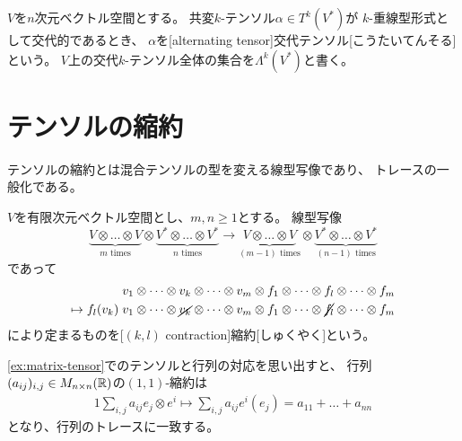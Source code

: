 \documentclass[report]{jlreq}
\begin{document}
\begin{definition}[交代テンソル]
    $V$を$n$次元ベクトル空間とする。
    共変$k$-テンソル$\alpha \in T^k(V^*)$が
    $k$-重線型形式として交代的であるとき、
    $\alpha$を[alternating tensor]{交代テンソル}[こうたいてんそる]という。
    $V$上の交代$k$-テンソル全体の集合を$\Lambda^k(V^*)$と書く。
\end{definition}

%
\section{テンソルの縮約}

テンソルの縮約とは混合テンソルの型を変える線型写像であり、
トレースの一般化である。

\begin{definition}[縮約]
    $V$を有限次元ベクトル空間とし、$m, n \ge 1$とする。
    線型写像
    \begin{equation}
        \underbrace{V \otimes \dots \otimes V}_{m \text{ times}}
        \otimes
        \underbrace{V^* \otimes \dots \otimes V^*}_{n \text{ times}}
        \to
        \underbrace{V \otimes \dots \otimes V}_{(m - 1) \text{ times}}
        \otimes
        \underbrace{V^* \otimes \dots \otimes V^*}_{(n - 1) \text{ times}}
    \end{equation}
    であって
    \begin{alignat}{1}
        &v_1 \otimes \dots \otimes v_k \otimes \dots \otimes v_m
            \otimes f_1 \otimes \dots \otimes f_l \otimes \dots \otimes f_m \\
        \mapsto f_l(v_k) \;
            &v_1 \otimes \dots \otimes \cancel{v_k} \otimes \dots \otimes v_m
            \otimes f_1 \otimes \dots \otimes \cancel{f_l} \otimes \dots \otimes f_m
    \end{alignat}
    により定まるものを[$(k, l)$ contraction]{縮約}[しゅくやく]という。
\end{definition}

\begin{example}[行列のトレースと縮約]
    \cref{ex:matrix-tensor}でのテンソルと行列の対応を思い出すと、
    行列$(a_{ij})_{i,j} \in M_{n \times n}(\mathbb{R})$の$(1, 1)$-縮約は
    \begin{alignat}{1}
        \sum_{i, j} a_{ij} e_j \otimes e^i
        \mapsto
        \sum_{i, j} a_{ij} e^i(e_j)
        = a_{11} + \dots + a_{nn}
    \end{alignat}
    となり、行列のトレースに一致する。
\end{example}
\end{document}
